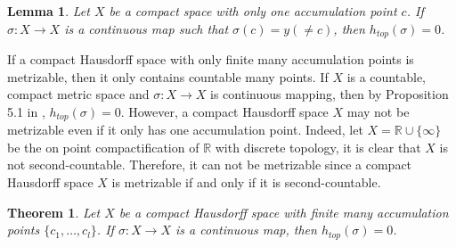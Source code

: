 \documentclass[a4paper,10pt]{amsart}
\newtheorem{theorem}{Theorem}[section]
\newtheorem{lemma}{Lemma}[section]
\newcommand{\R}{\mathbb R}  %
\begin{document}
\begin{lemma}
Let $X$ be a compact space with only one accumulation point
$c$. If $\sigma : X \rightarrow X$ is a continuous map such that
$\sigma(c) = y(\neq c)$, then $h_{top}(\sigma) = 0$.
\end{lemma}

If a compact 
Hausdorff space with only finite many accumulation points is metrizable, 
then it only contains countable many points. If $X$ is a countable, 
compact metric space and $\sigma: X \rightarrow X$ is continuous mapping, 
then by Proposition 5.1 in \cite{JO}, $h_{top}(\sigma) = 0$. 
However, a compact Hausdorff space $X$ may not be metrizable even if it
only has one accumulation point. Indeed, 
let $X = \R \cup \{\infty\}$ be
the on point compactification of $\R$ with discrete topology,
it is clear that $X$ is not second-countable. Therefore, it can not be
metrizable since a compact Hausdorff space $X$ 
is metrizable if and only if it is second-countable. 

 

\begin{theorem} 
 Let $X$ be a compact Hausdorff space with finite many accumulation points
$\{c_1, \ldots, c_l\}$. If $\sigma : X \rightarrow X$ is a 
continuous map, then $h_{top}(\sigma) = 0$. 
\end{theorem}
\end{document}
